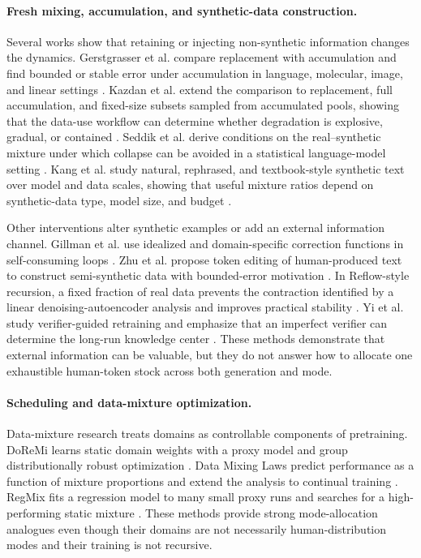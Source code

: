 \paragraph{Fresh mixing, accumulation, and synthetic-data construction.}
Several works show that retaining or injecting non-synthetic information changes the dynamics. Gerstgrasser et al. compare replacement with accumulation and find bounded or stable error under accumulation in language, molecular, image, and linear settings \cite{gerstgrasser2024inevitable}. Kazdan et al. extend the comparison to replacement, full accumulation, and fixed-size subsets sampled from accumulated pools, showing that the data-use workflow can determine whether degradation is explosive, gradual, or contained \cite{kazdan2025collapse}. Seddik et al. derive conditions on the real--synthetic mixture under which collapse can be avoided in a statistical language-model setting \cite{seddik2024synthetic}. Kang et al. study natural, rephrased, and textbook-style synthetic text over model and data scales, showing that useful mixture ratios depend on synthetic-data type, model size, and budget \cite{kang2025demystifying}.

Other interventions alter synthetic examples or add an external information channel. Gillman et al. use idealized and domain-specific correction functions in self-consuming loops \cite{gillman2024selfcorrecting}. Zhu et al. propose token editing of human-produced text to construct semi-synthetic data with bounded-error motivation \cite{zhu2025synthesize}. In Reflow-style recursion, a fixed fraction of real data prevents the contraction identified by a linear denoising-autoencoder analysis and improves practical stability \cite{zhu2026reflow}. Yi et al. study verifier-guided retraining and emphasize that an imperfect verifier can determine the long-run knowledge center \cite{yi2026verification}. These methods demonstrate that external information can be valuable, but they do not answer how to allocate one exhaustible human-token stock across both generation and mode.

\paragraph{Scheduling and data-mixture optimization.}
Data-mixture research treats domains as controllable components of pretraining. DoReMi learns static domain weights with a proxy model and group distributionally robust optimization \cite{xie2023doremi}. Data Mixing Laws predict performance as a function of mixture proportions and extend the analysis to continual training \cite{ye2025mixinglaws}. RegMix fits a regression model to many small proxy runs and searches for a high-performing static mixture \cite{liu2025regmix}. These methods provide strong mode-allocation analogues even though their domains are not necessarily human-distribution modes and their training is not recursive.

